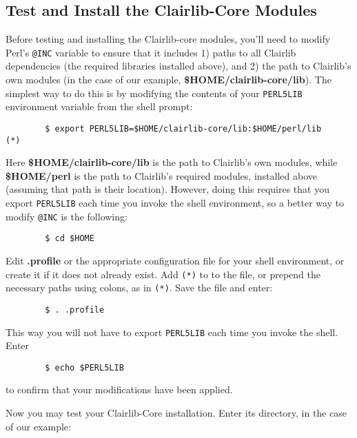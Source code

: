 \subsection*{Test and Install the Clairlib-Core Modules\label{Test_and_Install_the_Clairlib-Core_Modules}}


Before testing and installing the Clairlib-core modules, you'll need to modify Perl's \texttt{@INC} variable to ensure that it includes 1) paths to all Clairlib dependencies (the required libraries installed above), and 2) the path to Clairlib's own modules (in the case of our example, \textbf{\$HOME/clairlib-core/lib}). The simplest way to do this is by modifying the contents of your \texttt{PERL5LIB} environment variable from the shell prompt:

\begin{verbatim}
        $ export PERL5LIB=$HOME/clairlib-core/lib:$HOME/perl/lib     (*)
\end{verbatim}


Here \textbf{\$HOME/clairlib-core/lib} is the path to Clairlib's own modules, while \textbf{\$HOME/perl} is the path to Clairlib's required modules, installed above (assuming that path is their location). However, doing this requires that you export \texttt{PERL5LIB} each time you invoke the shell environment, so a better way to modify \texttt{@INC} is the following:

\begin{verbatim}
        $ cd $HOME
\end{verbatim}


Edit \textbf{.profile} or the appropriate configuration file for your shell environment, or create it if it does not already exist. Add \texttt{(*)} to to the file, or prepend the necessary paths using colons, as in \texttt{(*)}. Save the file and enter:

\begin{verbatim}
        $ . .profile
\end{verbatim}


This way you will not have to export \texttt{PERL5LIB} each time you invoke the
shell. Enter

\begin{verbatim}
        $ echo $PERL5LIB
\end{verbatim}


to confirm that your modifications have been applied.



Now you may test your Clairlib-Core installation. Enter its directory, in the case of our example:


